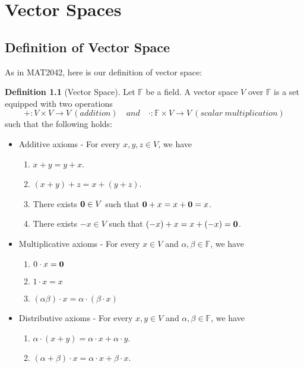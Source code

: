 \documentclass[11pt,openany]{book}
\theoremstyle{plain}
\theoremstyle{definition}
\newtheorem{definition}[definition]{Definition}
\theoremstyle{remark}
\begin{document}
\chapter{Vector Spaces}
\section{Definition of Vector Space}
As in MAT2042, here is our definition of vector space:
\begin{definition}[Vector Space]
Let $\mathbb{F}$ be a field. A vector space $V$ over $\mathbb{F}$ is a set equipped with two operations
$$+: V \times V \to V\ (addition) \quad and \quad  \cdot: \mathbb{F} \times V \to V\ (scalar\ multiplication)$$
such that the following holds:
\begin{itemize}
    \item Additive axioms - For every $x,y,z \in V$, we have
        \begin{enumerate}
            \item $x+y = y+x$.
            \item $(x+y)+z = x+(y+z)$.
            \item There exists ${\bf 0} \in V$ such that ${\bf 0}+x = x+{\bf 0} = x$.
            \item There exists $-x \in V$ such that $(-x) + x = x + (-x) = {\bf 0}$.
        \end{enumerate}
    \item Multiplicative axioms - For every $x \in V$ and $\alpha, \beta \in \mathbb{F}$, we have
        \begin{enumerate}
            \item $0 \cdot x = {\bf 0}$
            \item $1\cdot x = x$
            \item $(\alpha\beta)\cdot x = \alpha \cdot (\beta \cdot x)$
        \end{enumerate}
        \item Distributive axioms - For every $x,y \in V$ and $\alpha, \beta \in \mathbb{F}$, we have
        \begin{enumerate}
            \item $\alpha\cdot (x+y) = \alpha\cdot x + \alpha\cdot y$.
            \item $(\alpha+\beta)\cdot x = \alpha\cdot x + \beta\cdot x$.    
        \end{enumerate}
\end{itemize}  

\end{definition}
\end{document}

